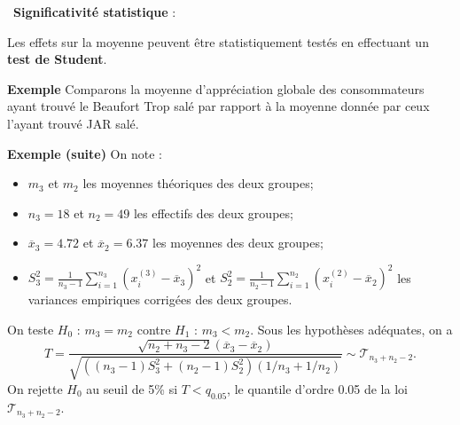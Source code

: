 \documentclass[aspectratio=169,xcolor=dvipsnames]{beamer}
\begin{document}
\begin{frame}

\textcolor{nyubluedarker}{\faCogs \ \textbf{Significativité statistique} :}

Les effets sur la moyenne peuvent être statistiquement testés en effectuant un \textbf{test de Student}.

\medskip

	\begin{exampleblock}{\textbf{Exemple}}
	Comparons la moyenne d'appréciation globale des consommateurs ayant trouvé le Beaufort \og Trop salé \fg{} par rapport à la moyenne donnée par ceux l'ayant trouvé \og JAR \fg{} salé.
	\end{exampleblock}
\end{frame}

\begin{frame}	
	\begin{exampleblock}{\textbf{Exemple (suite)}}
	On note :
		\begin{itemize}
		\item $m_3$ et $m_2$ les moyennes théoriques des deux groupes;
		\item $n_3 = 18$ et $n_2 = 49$ les effectifs des deux groupes;
		\item $\overline{x}_3 = 4.72$ et $\overline{x}_2 = 6.37$ les moyennes des deux groupes;
		\item $S_3^2 = \frac{1}{n_3-1} \sum_{i=1}^{n_3} (x_i^{(3)} - \overline{x}_3)^2$ et $S_2^2 = \frac{1}{n_2-1} \sum_{i=1}^{n_2} (x_i^{(2)} - \overline{x}_2)^2 $ les variances empiriques corrigées des deux groupes.
		\end{itemize}
	
	\medskip		
		
	On teste $H_0$ : $m_3 = m_2$ contre $H_1$ : $m_3 < m_2$. Sous les hypothèses adéquates, on a 
		\[
		T = \dfrac{ \sqrt{n_2+n_3-2} \left(\overline{x}_3-\overline{x}_2 \right)}{\sqrt{\left( (n_3-1) S_3^2 + (n_2-1) S_2^2 \right) \left( 1/n_3 + 1/n_2 \right)}} \sim \mathcal{T}_{n_3+n_2-2}.
		\]
	On rejette $H_0$ au seuil de 5\% si $T < q_{0.05}$, le quantile d'ordre 0.05 de la loi $\mathcal{T}_{n_3+n_2-2}$.   
	\end{exampleblock}

\end{frame}
\end{document}
